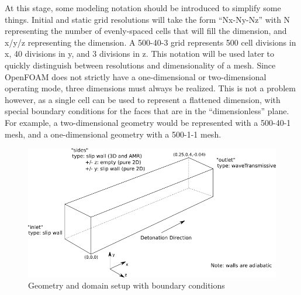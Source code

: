 At this stage, some modeling notation should be introduced to simplify some things. Initial and static grid resolutions will take the form ``Nx-Ny-Nz'' with N representing the number of evenly-spaced cells that will fill the dimension, and x/y/z representing the dimension. A 500-40-3 grid represents 500 cell divisions in x, 40 divisions in y, and 3 divisions in z. This notation will be used later to quickly distinguish between resolutions and dimensionality of a mesh. Since OpenFOAM does not strictly have a one-dimensional or two-dimensional operating mode, three dimensions must always be realized. This is not a problem however, as a single cell can be used to represent a flattened dimension, with special boundary conditions for the faces that are in the ``dimensionless'' plane. For example, a two-dimensional geometry would be represented with a 500-40-1 mesh, and a one-dimensional geometry with a 500-1-1 mesh. 

\begin{figure}[t!]
\centering
\includegraphics[width=\linewidth]{./figs/domainBC.png}
\caption{Geometry and domain setup with boundary conditions}
\label{fig:domainBC}
\end{figure}%

